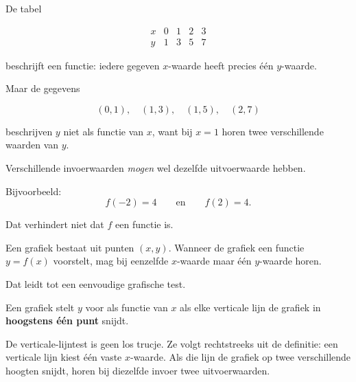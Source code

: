\documentclass{ximera}
\begin{document}
\begin{voorbeeld}

De tabel

\[
\begin{array}{c|cccc}
x&0&1&2&3\\
\hline
y&1&3&5&7
\end{array}
\]

beschrijft een functie: iedere gegeven \(x\)-waarde heeft precies één \(y\)-waarde.

Maar de gegevens

\[
(0,1),\quad (1,3),\quad (1,5),\quad (2,7)
\]

beschrijven \(y\) niet als functie van \(x\), want bij \(x=1\) horen
twee verschillende waarden van \(y\).
\end{voorbeeld}

\begin{opmerking}
Verschillende invoerwaarden \emph{mogen} wel dezelfde uitvoerwaarde hebben.

Bijvoorbeeld:
\[
f(-2)=4
\qquad\text{en}\qquad
f(2)=4.
\]

Dat verhindert niet dat \(f\) een functie is.
\end{opmerking}



Een grafiek bestaat uit punten \((x,y)\). Wanneer de grafiek een functie
\(y=f(x)\) voorstelt, mag bij eenzelfde \(x\)-waarde maar één \(y\)-waarde horen.

Dat leidt tot een eenvoudige grafische test.

\begin{eigenschap}
Een grafiek stelt \(y\) voor als functie van \(x\) als elke verticale lijn
de grafiek in \textbf{hoogstens één punt} snijdt.
\end{eigenschap}

De verticale-lijntest is geen los trucje. Ze volgt rechtstreeks uit de definitie:
een verticale lijn kiest één vaste \(x\)-waarde. Als die lijn de grafiek op
twee verschillende hoogten snijdt, horen bij diezelfde invoer twee uitvoerwaarden.
\end{document}
